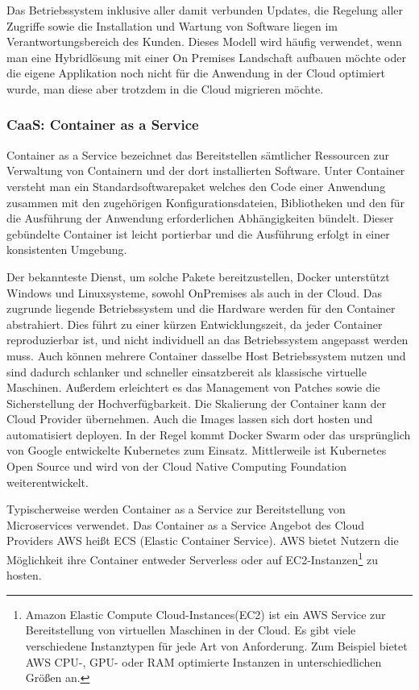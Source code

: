    Das Betriebssystem inklusive aller damit verbunden Updates, die Regelung aller Zugriffe sowie die Installation und Wartung von Software liegen im Verantwortungsbereich des Kunden.
   Dieses Modell wird häufig verwendet, wenn man eine Hybridlösung mit einer On Premises Landschaft aufbauen möchte oder die eigene Applikation noch nicht für die Anwendung in der Cloud optimiert wurde, man diese aber trotzdem in die Cloud migrieren möchte.\cite{CloudComputingDef}

   \subsubsection{CaaS: Container as a Service}
   Container as a Service bezeichnet das Bereitstellen sämtlicher Ressourcen zur Verwaltung von Containern und der dort installierten Software.
   Unter Container versteht man ein {}\glqq Standardsoftwarepaket\grqq{} welches {}\glqq den Code einer Anwendung zusammen mit den zugehörigen Konfigurationsdateien,
   Bibliotheken und den für die Ausführung der Anwendung erforderlichen Abhängigkeiten\grqq{} bündelt. \cite{CaaS}
   Dieser gebündelte Container ist leicht portierbar und die Ausführung erfolgt in einer konsistenten Umgebung.

   Der bekannteste Dienst, um solche Pakete bereitzustellen, Docker unterstützt Windows und Linuxsysteme, sowohl OnPremises als auch in der Cloud.
   Das zugrunde liegende Betriebssystem und die Hardware werden für den Container abstrahiert.
   Dies führt zu einer kürzen Entwicklungszeit, da jeder Container reproduzierbar ist, und nicht individuell an das Betriebssystem angepasst werden muss.
   Auch können mehrere Container dasselbe Host Betriebssystem nutzen und sind dadurch schlanker und schneller einsatzbereit als klassische virtuelle Maschinen.
   Außerdem erleichtert es das Management von Patches sowie die Sicherstellung der Hochverfügbarkeit.
   Die Skalierung der Container kann der Cloud Provider übernehmen. Auch die Images lassen sich dort hosten und automatisiert deployen.
   In der Regel kommt Docker Swarm oder das ursprünglich von Google entwickelte Kubernetes zum Einsatz.
   Mittlerweile ist Kubernetes Open Source und wird von der Cloud Native Computing Foundation weiterentwickelt.

   Typischerweise werden Container as a Service zur Bereitstellung von Microservices verwendet.
   Das Container as a Service Angebot des Cloud Providers AWS heißt ECS (Elastic Container Service).
   AWS bietet Nutzern die Möglichkeit ihre Container entweder Serverless oder auf EC2-Instanzen\footnote{Amazon Elastic Compute Cloud-Instances(EC2) ist ein AWS Service
   zur Bereitstellung von virtuellen Maschinen in der Cloud. Es gibt viele verschiedene Instanztypen für jede Art von Anforderung.
   Zum Beispiel bietet AWS CPU-, GPU- oder RAM optimierte Instanzen in unterschiedlichen Größen an. } zu hosten. \cite{AWSECS}

